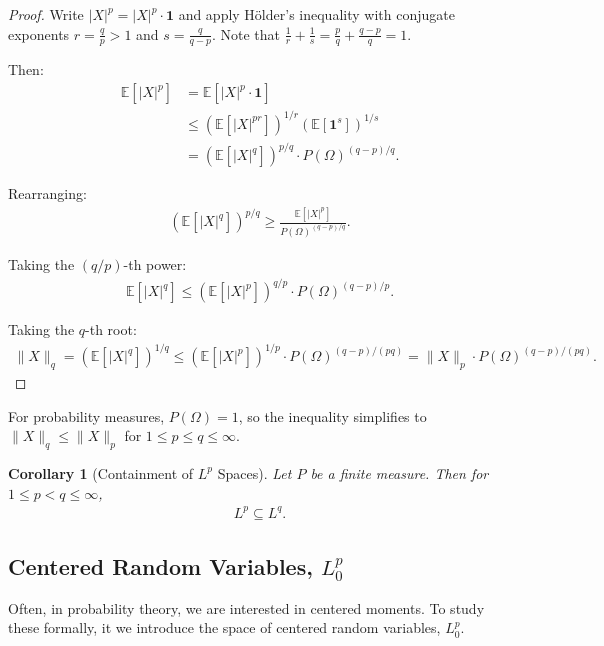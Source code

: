\documentclass[11pt,reqno]{amsart}
\newtheorem{corollary}[theorem]{Corollary}
\theoremstyle{definition}
\theoremstyle{remark}
\begin{document}
\begin{proof}
	Write $|X|^p = |X|^p \cdot \mathbf{1}$ and apply Hölder's inequality with conjugate exponents $r = \frac{q}{p} > 1$ and $s = \frac{q}{q-p}$. Note that $\frac{1}{r} + \frac{1}{s} = \frac{p}{q} + \frac{q-p}{q} = 1$.

	Then:
	\begin{align*}
		\mathbb{E}[|X|^p] & = \mathbb{E}[|X|^p \cdot \mathbf{1}]                               \\
		                  & \leq (\mathbb{E}[|X|^{pr}])^{1/r} (\mathbb{E}[\mathbf{1}^s])^{1/s} \\
		                  & = (\mathbb{E}[|X|^q])^{p/q} \cdot P(\Omega)^{(q-p)/q}.
	\end{align*}

	Rearranging:
	\begin{align*}
		(\mathbb{E}[|X|^q])^{p/q} \geq \frac{\mathbb{E}[|X|^p]}{P(\Omega)^{(q-p)/q}}.
	\end{align*}

	Taking the $(q/p)$-th power:
	\begin{align*}
		\mathbb{E}[|X|^q] \leq \left(\mathbb{E}[|X|^p]\right)^{q/p} \cdot P(\Omega)^{(q-p)/p}.
	\end{align*}

	Taking the $q$-th root:
	\begin{align*}
		\|X\|_q = (\mathbb{E}[|X|^q])^{1/q} \leq \left(\mathbb{E}[|X|^p]\right)^{1/p} \cdot P(\Omega)^{(q-p)/(pq)} = \|X\|_p \cdot P(\Omega)^{(q-p)/(pq)}.
	\end{align*}
\end{proof}

For probability measures, \(P(\Omega) = 1\), so the inequality simplifies to \(\|X\|_q \leq \|X\|_p\) for \(1 \leq p \leq q \leq \infty\).

\begin{corollary}[Containment of \(L^p\) Spaces]
	Let \(P\) be a finite measure. Then for \(1 \leq p < q \leq \infty\),
	\begin{align*}
		L^p \subseteq L^q.
	\end{align*}
\end{corollary}

\subsection{Centered Random Variables, \(L^p_0\)}

Often, in probability theory, we are interested in centered moments. To study these formally, it we introduce the space of centered random variables, \(L^p_0\).
\end{document}
